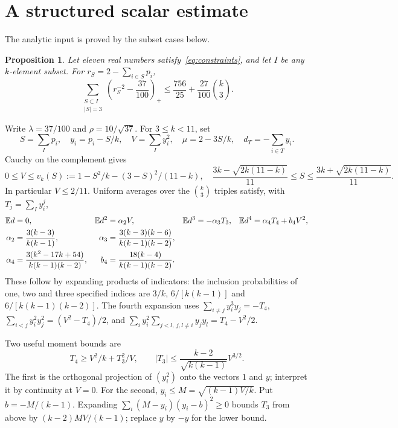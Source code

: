 \documentclass[11pt]{article}
\newtheorem{proposition}[theorem]{Proposition}
\newcommand{\EE}{\mathbb E}
\newcommand{\pos}[1]{(#1)_+}
\begin{document}
\section{A structured scalar estimate}
The analytic input is proved by the subset cases below.
\begin{proposition}\label{prop:scalar}
Let eleven real numbers satisfy~\eqref{eq:constraints}, and let $I$
be any $k$-element subset. For $r_S=2-\sum_{i\in S}p_i$,
\begin{equation}\label{eq:contract}
 \sum_{\substack{S\subset I\\|S|=3}}\pos{r_S^{-2}-\frac{37}{100}}
 \le\frac{756}{25}+\frac{27}{100}\binom k3.
\end{equation}
\end{proposition}
Write $\lambda=37/100$ and $\rho=10/\sqrt{37}$.
For $3\le k<11$, set
\[
 S=\sum_Ip_i,\quad y_i=p_i-S/k,\quad V=\sum_Iy_i^2,
 \quad\mu=2-3S/k,\quad d_T=-\sum_{i\in T}y_i.
\]
Cauchy on the complement gives
\begin{equation}\label{eq:subsetV}
 0\le V\le v_k(S):=1-S^2/k-(3-S)^2/(11-k),\quad
 \frac{3k-\sqrt{2k(11-k)}}{11}\le S\le
 \frac{3k+\sqrt{2k(11-k)}}{11}.
\end{equation}
In particular $V\le2/11$. Uniform averages over the $\binom k3$
triples satisfy, with $T_j=\sum_I y_i^j$,
\begin{align}
 \EE d&=0,&\EE d^2&=\alpha_2V,&\EE d^3&=-\alpha_3T_3,
 &\EE d^4&=\alpha_4T_4+b_4V^2,\label{eq:moments}\\
 \alpha_2&=\frac{3(k-3)}{k(k-1)},&
 \alpha_3&=\frac{3(k-3)(k-6)}{k(k-1)(k-2)},\notag\\
 \alpha_4&=\frac{3(k^2-17k+54)}{k(k-1)(k-2)},&
 b_4&=\frac{18(k-4)}{k(k-1)(k-2)}.\notag
\end{align}
These follow by expanding products of indicators: the inclusion
probabilities of one, two and three specified indices are
$3/k$, $6/[k(k-1)]$ and $6/[k(k-1)(k-2)]$.
The fourth expansion uses
$\sum_{i\ne j}y_i^3y_j=-T_4$,
$\sum_{i<j}y_i^2y_j^2=(V^2-T_4)/2$, and
$\sum_i y_i^2\sum_{j<l,\ j,l\ne i}y_jy_l=T_4-V^2/2$.

Two useful moment bounds are
\begin{equation}\label{eq:joint}
 T_4\ge V^2/k+T_3^2/V,\qquad
 |T_3|\le\frac{k-2}{\sqrt{k(k-1)}}V^{3/2}.
\end{equation}
The first is the orthogonal projection of $(y_i^2)$ onto the vectors
$1$ and $y$; interpret it by continuity at $V=0$.
For the second, $y_i\le M=\sqrt{(k-1)V/k}$. Put $b=-M/(k-1)$.
Expanding $\sum_i(M-y_i)(y_i-b)^2\ge0$ bounds $T_3$ from above
by $(k-2)MV/(k-1)$; replace $y$ by $-y$ for the lower bound.
\end{document}
